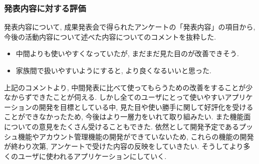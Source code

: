 \subsubsection{発表内容に対する評価}
発表内容について, 成果発表会で得られたアンケートの「発表内容」の項目から, 今後の活動内容について述べた内容についてのコメントを抜粋した.
\begin{itemize}
    \item 中間よりも使いやすくなっていたが, まだまだ見た目のが改善できそう.
    \item 家族間で扱いやすいようにすると, より良くなるいいと思った.
\end{itemize}
上記のコメントより, 中間発表に比べて使ってもらうための改善をすることが少なからずできたことが伺える. しかし全てのユーザにとって使いやすいアプリケーションの開発を目標としている中,
見た目や使い勝手に関して好評化を受けることができなかったため, 今後はより一層力をいれて取り組みたい.
また機能面についての意見をたくさん受けることもできた. 依然として開発予定であるプッシュ機能やアカウント管理機能の開発ができていないため,
これらの機能の開発が終わり次第, アンケートで受けた内容の反映をしていきたい. そうしてより多くのユーザに使われるアプリケーションにしていく.

